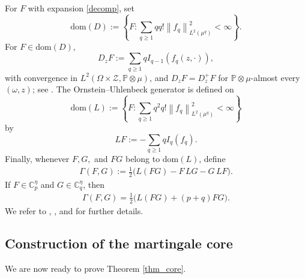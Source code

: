 \documentclass[ECP,preprint]{ejpecp}
\newcommand{\PP}{\mathbb{P}}
\newcommand{\cZ}{\mathcal{Z}}
\newcommand{\bC}{\mathbb{C}^\eta}
\newcommand{\norm}[1]{\left\lVert #1\right\rVert}
\newcommand{\dom}{\text{dom}}
\begin{document}
For $F$ with expansion \eqref{decomp}, set
\[
\dom(D)
:=
\left\{
F:
\sum_{q\geq1}q q!
\norm{f_q}_{L^2(\mu^q)}^2<\infty
\right\}.
\]
For $F\in\dom(D)$,
\[
D_zF
:=
\sum_{q\geq1}qI_{q-1}(f_q(z,\cdot)),
\]
with convergence in
$L^2(\Omega\times\cZ,\PP\otimes\mu)$, and
$D_zF=D_z^+F$ for $\PP\otimes\mu$-almost every
$(\omega,z)$; see \cite[(19)]{DP18}.  The
Ornstein--Uhlenbeck generator is defined on
\[
\dom(L)
:=
\left\{
F:
\sum_{q\geq1}q^2q!
\norm{f_q}_{L^2(\mu^q)}^2<\infty
\right\}
\]
by
\[
LF
:=
-\sum_{q\geq1}qI_q(f_q).
\]
Finally, whenever $F,G,$ and $FG$ belong to $\dom(L)$, define
\begin{align}
\Gamma(F,G)
:=
\frac{1}{2}
\bigl(L(FG)-F\,LG-G\,LF\bigr).
\label{Gamma_def}
\end{align}
If $F\in\bC_p$ and $G\in\bC_q$, then
\begin{align}
\Gamma(F,G)
=
\frac{1}{2}
\bigl(L(FG)+(p+q)FG\bigr).
\label{Gamma_chaos}
\end{align}
We refer to \cite{Last16}, \cite[Chapter~20]{LP18}, and
\cite[Section~2]{DP18} for further details.


\subsection{Construction of the martingale core} \label{SEC_22}

We are now ready to prove Theorem \ref{thm_core}.
\end{document}
